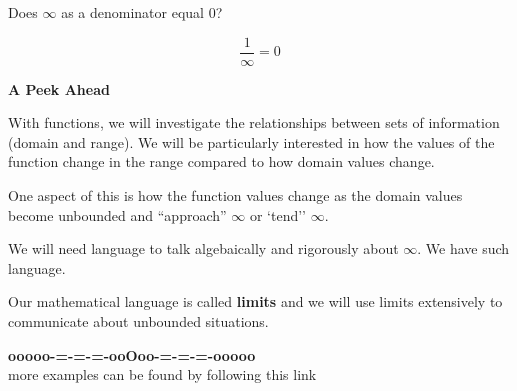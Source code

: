 \documentclass{ximera}
\begin{document}
\begin{question} 


Does $\infty$ as a denominator equal $0$?

\[  \frac{1}{\infty} = 0 \]


\begin{multipleChoice}
\end{multipleChoice}


\end{question}












\item \textbf{\textcolor{purple!85!blue}{A Peek Ahead}} 


With functions, we will investigate the relationships between sets of information (domain and range).  We will be particularly interested in how the values of the function change in the range compared to how domain values change. 

One aspect of this is how the function values change as the domain values become unbounded and ``approach'' $\infty$ or `tend'' $\infty$. 

We will need language to talk algebaically and rigorously about $\infty$. We have such language.  


Our mathematical language is called \textbf{\textcolor{purple!85!blue}{limits}} and we will use limits extensively to communicate about unbounded situations.  









\begin{center}
\textbf{\textcolor{green!50!black}{ooooo-=-=-=-ooOoo-=-=-=-ooooo}} \\

more examples can be found by following this link\\ 

\end{center}
\end{document}
